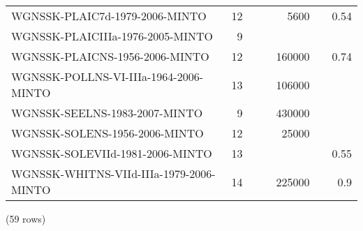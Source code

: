 \begin{tabular}{l | r | r | r | r | r | r}
WGNSSK-PLAIC7d-1979-2006-MINTO & 12 &  &  & 5600 &  & 0.54 \\
WGNSSK-PLAICIIIa-1976-2005-MINTO & 9 &  &  &  &  &  \\
WGNSSK-PLAICNS-1956-2006-MINTO & 12 &  &  & 160000 &  & 0.74 \\
WGNSSK-POLLNS-VI-IIIa-1964-2006-MINTO & 13 &  &  & 106000 &  &  \\
WGNSSK-SEELNS-1983-2007-MINTO & 9 &  &  & 430000 &  &  \\
WGNSSK-SOLENS-1956-2006-MINTO & 12 &  &  & 25000 &  &  \\
WGNSSK-SOLEVIId-1981-2006-MINTO & 13 &  &  &  &  & 0.55 \\
WGNSSK-WHITNS-VIId-IIIa-1979-2006-MINTO & 14 &  &  & 225000 &  & 0.9 \\
\end{tabular}

\noindent (59 rows) \\

